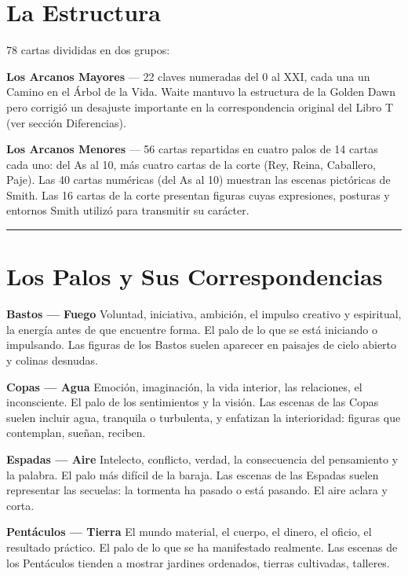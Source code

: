 \section{La Estructura}\label{the-structure}

78 cartas divididas en dos grupos:

\textbf{Los Arcanos Mayores} --- 22 claves numeradas del 0 al XXI, cada una un Camino en el Árbol de la Vida. Waite mantuvo la estructura de la Golden Dawn pero corrigió un desajuste importante en la correspondencia original del Libro T (ver sección Diferencias).

\textbf{Los Arcanos Menores} --- 56 cartas repartidas en cuatro palos de 14 cartas cada uno: del As al 10, más cuatro cartas de la corte (Rey, Reina, Caballero, Paje). Las 40 cartas numéricas (del As al 10) muestran las escenas pictóricas de Smith. Las 16 cartas de la corte presentan figuras cuyas expresiones, posturas y entornos Smith utilizó para transmitir su carácter.

\begin{center}\rule{0.5\linewidth}{0.5pt}\end{center}

\section{Los Palos y Sus Correspondencias}\label{the-suits-and-their-correspondences}

\textbf{Bastos --- Fuego} Voluntad, iniciativa, ambición, el impulso creativo y espiritual, la energía antes de que encuentre forma. El palo de lo que se está iniciando o impulsando. Las figuras de los Bastos suelen aparecer en paisajes de cielo abierto y colinas desnudas.

\textbf{Copas --- Agua} Emoción, imaginación, la vida interior, las relaciones, el inconsciente. El palo de los sentimientos y la visión. Las escenas de las Copas suelen incluir agua, tranquila o turbulenta, y enfatizan la interioridad: figuras que contemplan, sueñan, reciben.

\textbf{Espadas --- Aire} Intelecto, conflicto, verdad, la consecuencia del pensamiento y la palabra. El palo más difícil de la baraja. Las escenas de las Espadas suelen representar las secuelas: la tormenta ha pasado o está pasando. El aire aclara y corta.

\textbf{Pentáculos --- Tierra} El mundo material, el cuerpo, el dinero, el oficio, el resultado práctico. El palo de lo que se ha manifestado realmente. Las escenas de los Pentáculos tienden a mostrar jardines ordenados, tierras cultivadas, talleres.

